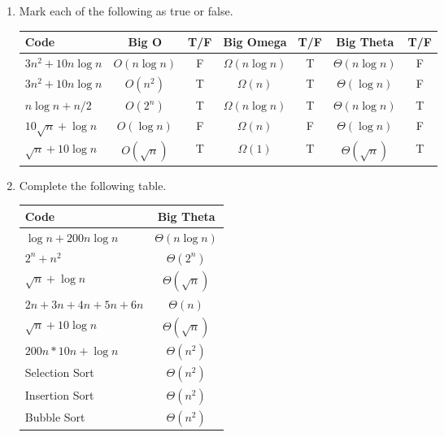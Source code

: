 \documentclass[11pt]{article}
\begin{document}
    \begin{enumerate}
        \item Mark each of the following as true or false.
        \begin{center}
            \begin{tabular}{l | c | c | c | c | c | c}
                Code & Big O & T/F & Big Omega & T/F & Big Theta & T/F \\ \hline
                $3 n^2 + 10 n \log n$ & $O(n \log n)$ & F & $\Omega(n \log n)$ & T & $\Theta(n \log n)$ & F \\ \hline
                $3 n^2 + 10 n \log n$ & $O(n^2)$ & T & $\Omega(n)$ & T & $\Theta(\log n)$ & F \\ \hline
                $n \log n + n/2$ & $O(2^n)$ & T & $\Omega(n \log n)$ & T & $\Theta(n \log n)$ & T \\ \hline
                $10 \sqrt{n} + \log n$ & $O(\log n)$ & F & $\Omega(n)$ & F & $\Theta(\log n)$ & F \\ \hline
                $\sqrt{n} + 10 \log n$ & $O(\sqrt n)$ & T & $\Omega(1)$ & T & $\Theta(\sqrt n)$ & T \\ \hline
            \end{tabular}
        \end{center}
        \item Complete the following table.
        \begin{center}
            \begin{tabular}{l | c }
                Code & Big Theta \\ \hline
                $\log n + 200 n \log n$ & $\Theta(n \log n)$ \\ \hline
                $2^n + n^2$ & $\Theta(2^n)$ \\ \hline
                $\sqrt n + \log n$ & $\Theta(\sqrt n)$ \\ \hline
                $2n + 3n + 4n + 5n + 6n$ & $\Theta(n)$ \\ \hline
                $\sqrt{n} + 10 \log n$ & $\Theta(\sqrt n)$ \\ \hline
                $200 n * 10 n + \log n$ & $\Theta(n^2)$ \\ \hline
                Selection Sort & $\Theta(n^2)$ \\ \hline
                Insertion Sort & $\Theta(n^2)$ \\ \hline
                Bubble Sort & $\Theta(n^2)$ \\ \hline
            \end{tabular}
        \end{center}
        

\end{enumerate}
\end{document}
